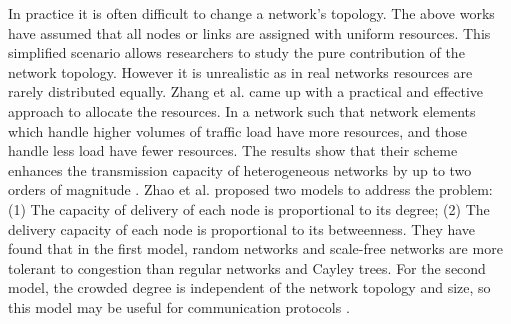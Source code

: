 \documentclass[onecolumn,preprintnumbers,amsmath,amssymb]{revtex4}
\begin{document}
In practice it is often difficult to change a network’s topology. 
The above works have assumed that all nodes or links are assigned with uniform resources. 
This simplified scenario allows researchers to study the pure contribution of the network topology. 
However it is unrealistic as in real networks resources are rarely distributed equally.
Zhang et al. came up with a practical and effective approach to allocate the resources. In a network such that network elements which handle higher volumes of traffic load have more resources, and those  handle less load have fewer resources. 
The results show that their scheme enhances the transmission capacity of heterogeneous networks  by up to two orders of magnitude \cite{GQZ}.
Zhao et al. proposed two models to address the problem: 
(1) The capacity of delivery of each node is proportional to its degree; 
(2) The delivery capacity of each node is proportional to its betweenness. 
They have found that in the first model, random networks and scale-free networks are more tolerant to congestion than regular networks and Cayley trees. 
For the second model, the crowded degree is independent of the network topology and size, so this model may be useful for communication protocols \cite{LZY}.
\end{document}
